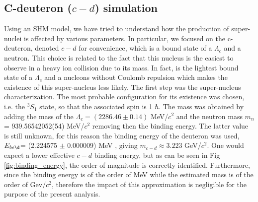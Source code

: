 \documentclass[12pt,a4paper]{book}
\begin{document}
	
	\FloatBarrier
	\subsection{C-deuteron ($c-d$) simulation}
	
	Using an SHM model, we have tried to understand how the production of super-nuclei is affected by various parameters. In particular, we focused on the c-deuteron, denoted $c-d$ for convenience, which is a bound state of a $\Lambda_c$ and a neutron. This choice is related to the fact that this nucleus is the easiest to observe in a heavy ion collision due to its mass. In fact, is the lightest bound state of a $\Lambda_c$ and a nucleons without Coulomb repulsion which makes the existence of this super-nucleus less likely.
	The first step was the super-nucleus characterization. The most probable configuration for its existence was chosen, i.e. the $^{3}S_1$ state, so that the associated spin is 1 $\hbar$. The mass was obtained by adding the mass of the $\Lambda_c = (2286.46 \pm 0.14)$ MeV/$c^2$ and the neutron mass $m_n$ = 939.56542052(54) MeV/$c^2$ \cite{ParticleDataGroup:2024cfk} removing then the binding energy. The latter value is still unknown, for this reason the binding energy of the deuteron was used, $E_{be \d}$= (2.224575 $\pm$ 0.000009) MeV \cite{VANDERLEUN1982261}, giving $m_{c-d} \approx 3.223$ GeV/$c^2$. One would expect a lower effective $c-d$ binding energy, but as can be seen in Fig \ref{fig:binding_energy}, the order of magnitude is correctly identified. Furthermore, since the binding energy is of the order of MeV while the estimated mass is of the order of Gev/$c^2$, therefore the impact of this approximation is negligible for the purpose of the present analysis.
	
\end{document}
